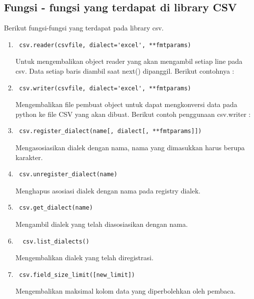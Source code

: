\subsection{Fungsi - fungsi yang terdapat di library CSV}
Berikut fungsi-fungsi yang terdapat pada library csv.
\begin{enumerate}
\item \begin{verbatim} csv.reader(csvfile, dialect='excel', **fmtparams) \end{verbatim} Untuk mengembalikan	object reader yang akan mengambil setiap line pada csv. Data setiap baris diambil saat next() dipanggil. Berikut contohnya : 
 \item \begin{verbatim} csv.writer(csvfile, dialect='excel', **fmtparams) \end{verbatim} Mengembalikan file pembuat object untuk dapat mengkonversi data pada python ke file CSV yang akan dibuat. Berikut contoh penggunaan csv.writer : 
 \item \begin{verbatim} csv.register_dialect(name[, dialect[, **fmtparams]]) \end{verbatim} Mengasosiasikan dialek dengan nama, nama yang dimasukkan harus berupa karakter.
 \item \begin{verbatim} csv.unregister_dialect(name) \end{verbatim}
	Menghapus asosiasi dialek dengan nama pada registry dialek.
 \item \begin{verbatim} csv.get_dialect(name) \end{verbatim}
	Mengambil dialek yang telah diasosiasikan dengan nama. 
 \item \begin{verbatim}  csv.list_dialects() \end{verbatim} Mengembalikan dialek yang telah diregistrasi.
 \item \begin{verbatim} csv.field_size_limit([new_limit]) \end{verbatim} Mengembalikan maksimal kolom data yang diperbolehkan oleh pembaca.
\end{enumerate}

